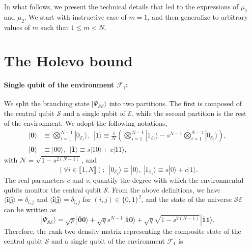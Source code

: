 \documentclass[aps,prl,showpacs,amsmath,amssymb,amsfonts,lengthcheck,onecolumn,longbibliography,superscriptaddress]{revtex4-2}
\newcommand{\thickbar}[1]{\mathbf{\bar{\text{$#1$}}}}
\newcommand{\cS}        {{\mathcal S}}
\newcommand{\cE}        {{\mathcal E}}
\newcommand{\+}         {\dagger}
\newcommand{\mc}[1]{\mathcal{#1}}
\begin{document}
In what follows, we present the technical details that led to the expressions of $\mu_1$ and $\mu_2$. We start with instructive case of $m=1$, and then generalize to arbitrary values of $m$ such that $1\leq m < N$.

\section{The Holevo bound}
\paragraph{Single qubit of the environment $\mc{F}_1$:}
We split the branching state $| \Psi_\mathcal{SE} \rangle$ into two partitions. The first is composed of the central qubit $\mc{S}$ and a single qubit of $\mc{E}$, while the second partition is the rest of the environment. We adopt the following notations,
\begin{equation}
	\begin{split}
		| \boldsymbol{0} \rangle &\equiv \bigotimes_{i=1}^{N-1} | 0_{\cE_{i}} \rangle,\ \ | \boldsymbol{1} \rangle \equiv \frac{1}{\mc{N}}\left(\bigotimes_{i=1}^{N-1} |  1_{\cE_{i}} \rangle-s^{N-1}\bigotimes_{i=1}^{N-1} |  0_{\cE_{i}} \rangle\right),\\
		| \thickbar{0} \rangle &\equiv|00\rangle ,\ \ | \thickbar{1} \rangle \equiv s|10\rangle+c|11\rangle,
		\label{basis1}
	\end{split}
\end{equation}
with $\mc{N}=\sqrt{1-s^{2(N-1)}}$, and
\begin{equation}
(\forall i \in \llbracket 1, N\rrbracket); 
\ \	|  0_{\cE_{i}} \rangle \equiv | 0 \rangle ,\ | 1_{\cE_{i}} \rangle \equiv s | 0 \rangle + c | 1 \rangle.
\end{equation}
The real parameters $c$ and $s$, quantify the degree with which the environmental qubits monitor the central qubit $\cS$. From the above definitions, we have $\langle \boldsymbol{i}|\boldsymbol{j} \rangle=\delta_{i,j}$ and $\langle \thickbar{i}|\thickbar{j} \rangle=\delta_{i,j}$ for $(i,j) \in \{0,1\}^2$, and the state of the universe $\mc{S}\mc{E}$ can be written as
\begin{equation}
		| \Psi_\mathcal{SE} \rangle = \sqrt{p} |\thickbar{0}\boldsymbol{0}\rangle+\sqrt{q}s^{N-1}|\thickbar{1}\boldsymbol{0}\rangle+\sqrt{q}\sqrt{1-s^{2(N-1)}}|\thickbar{1}\boldsymbol{1}\rangle.
\end{equation}
Therefore, the rank-two density matrix representing the composite state of the central qubit $\mc{S}$ and a single qubit of the environment $\mc{F}_1$ is
\end{document}
